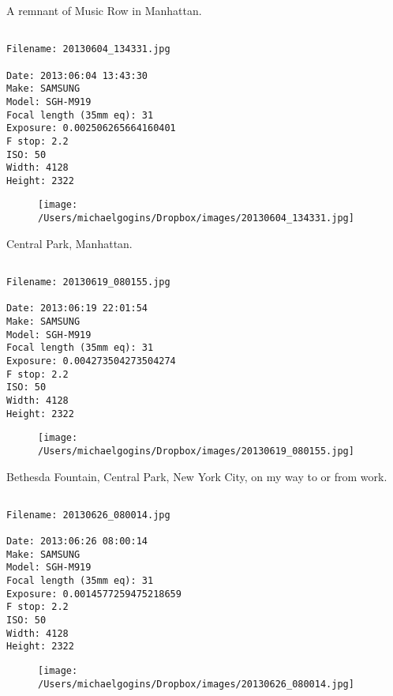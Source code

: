 \clearpage
\onecolumn
\noindent A remnant of Music Row in Manhattan.
\noindent
\begin{lstlisting}

Filename: 20130604_134331.jpg

Date: 2013:06:04 13:43:30
Make: SAMSUNG
Model: SGH-M919
Focal length (35mm eq): 31
Exposure: 0.002506265664160401
F stop: 2.2
ISO: 50
Width: 4128
Height: 2322
\end{lstlisting}
\clearpage

\begin{figure}
\texttt{[image: /Users/michaelgogins/Dropbox/images/20130604\_134331.jpg]}
\end{figure}
    
\clearpage
\onecolumn
\noindent Central Park, Manhattan.
\noindent
\begin{lstlisting}

Filename: 20130619_080155.jpg

Date: 2013:06:19 22:01:54
Make: SAMSUNG
Model: SGH-M919
Focal length (35mm eq): 31
Exposure: 0.004273504273504274
F stop: 2.2
ISO: 50
Width: 4128
Height: 2322
\end{lstlisting}
\clearpage

\begin{figure}
\texttt{[image: /Users/michaelgogins/Dropbox/images/20130619\_080155.jpg]}
\end{figure}
    
\clearpage
\onecolumn
\noindent Bethesda Fountain, Central Park, New York City, on my way to or from work.
\noindent
\begin{lstlisting}

Filename: 20130626_080014.jpg

Date: 2013:06:26 08:00:14
Make: SAMSUNG
Model: SGH-M919
Focal length (35mm eq): 31
Exposure: 0.0014577259475218659
F stop: 2.2
ISO: 50
Width: 4128
Height: 2322
\end{lstlisting}
\clearpage

\begin{figure}
\texttt{[image: /Users/michaelgogins/Dropbox/images/20130626\_080014.jpg]}
\end{figure}
    
